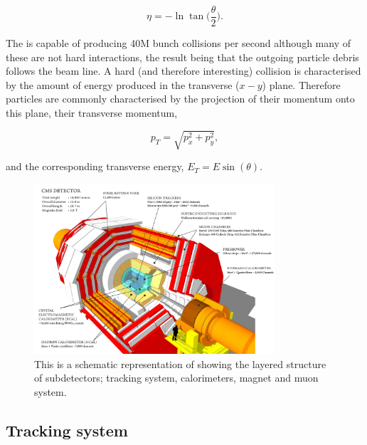 \begin{equation}
	\eta = -\ln\tan\biggl(\frac{\theta}{2}\biggr).
\end{equation}

The \LHC is capable of producing 40M bunch collisions per second although many of these are not hard interactions, the result being that the outgoing particle debris follows the beam line. A hard (and therefore interesting) collision is characterised by the amount of energy produced in the transverse ($x-y$) plane. Therefore particles are commonly characterised by the projection of their momentum onto this plane, their transverse momentum,

\begin{equation}
	p_{T} = \sqrt{p_{x}^{2}+p_{y}^{2}},
\end{equation}

and the corresponding transverse energy, $E_{T} = E\sin(\theta)$.

\begin{figure}
  \includegraphics[width=0.8\textwidth]{ch2_cms_exp/plots/cms_diagram.png}
  \caption[CMS diagram]{This is a schematic representation of \CMS showing the layered structure of subdetectors; tracking system, calorimeters, magnet and muon system.}
  \label{fig:cms_diagram}
\end{figure}

\subsection{Tracking system}
\label{sec:tracker}

